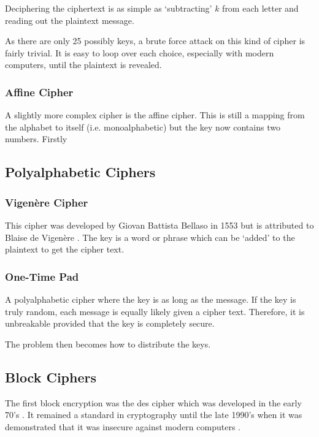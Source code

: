 Deciphering the ciphertext is as simple as `subtracting' $k$ from each letter and reading out the plaintext message.

As there are only 25 possibly keys, a brute force attack on this kind of cipher is fairly trivial. It is easy to loop over each choice, especially with modern computers, until the plaintext is revealed.

\subsubsection*{Affine Cipher}

A slightly more complex cipher is the affine cipher. This is still a mapping from the alphabet to itself (i.e. monoalphabetic) but the key now contains two numbers. Firstly

\subsection{Polyalphabetic Ciphers}



\subsubsection*{Vigen\`{e}re Cipher}

This cipher was developed by Giovan Battista Bellaso in 1553 \cite{} but is attributed to Blaise de Vigen\`{e}re \cite{}. The key is a word or phrase which can be `added' to the plaintext to get the cipher text.

\subsubsection*{One-Time Pad}

A polyalphabetic cipher where the key is as long as the message. If the key is truly random, each message is equally likely given a cipher text. Therefore, it is unbreakable provided that the key is completely secure.

The problem then becomes how to distribute the keys.

\subsection{Block Ciphers}

The first block encryption was the \ac{des} cipher which was developed in the early 70's \cite{}. It remained a standard in cryptography until the late 1990's when it was demonstrated that it was insecure against modern computers \cite{}. 


